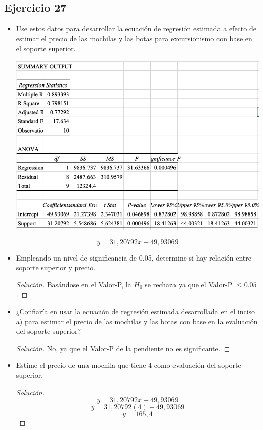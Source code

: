 \documentclass[a4paper,12pt]{article}
\newenvironment{solution}
  {\renewcommand\qedsymbol{$\blacksquare$}\begin{proof}[Solución]}
  {\end{proof}}
\begin{document}
\subsection{Ejercicio 27}
\begin{itemize}
    \item  Use estos datos para desarrollar la ecuación de regresión estimada a efecto de estimar el precio de las mochilas y las botas para excursionismo con base en el soporte superior.
    \begin{center}
        \includegraphics[scale=0.5]{Imagenes/27-1.png}
    \end{center}
    $$y=31,20792x+49,93069$$
    \item  Empleando un nivel de significancia de 0.05, determine si hay relación entre soporte superior y precio.
    \begin{solution}
    Basándose en el Valor-P, la $H_0$ se rechaza ya que el Valor-P $\leq 0.05$. 
    \end{solution}


    \item ¿Confiaría en usar la ecuación de regresión estimada desarrollada en el inciso a) para estimar el precio de las mochilas y las botas con base en la evaluación del soporte superior?
    \begin{solution}
    No, ya que el Valor-P de la pendiente no es significante.
    \end{solution}
    \item  Estime el precio de una mochila que tiene 4 como evaluación del soporte superior.
    
    \begin{solution}
    $$y=31,20792x+49,93069$$
    $$y=31,20792(4)+49,93069$$
    $$y= 165,4$$
    \end{solution}
\end{itemize}
\end{document}
